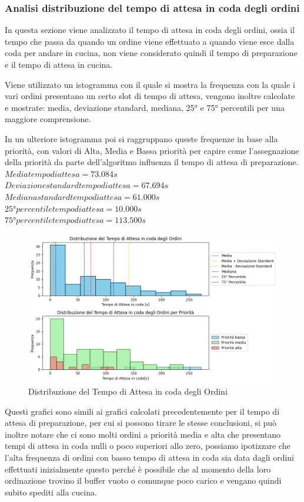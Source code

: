 \subsubsection{Analisi distribuzione del tempo di attesa in coda degli ordini}
In questa sezione viene analizzato il tempo di attesa in coda degli ordini, ossia il tempo che passa da quando un ordine viene effettuato a quando viene esce dalla coda per andare in cucina, non viene considerato quindi il tempo di preparazione e il tempo di attesa in cucina.

Viene utilizzato un istogramma con il quale si mostra la frequenza con la quale i vari ordini presentano un certo slot di tempo di attesa, vengono inoltre calcolate e mostrate: media, deviazione standard, mediana, 25° e 75° percentili per una maggiore comprensione.

In un ulteriore istogramma poi si raggruppano queste frequenze in base alla priorità, con valori di Alta, Media e Bassa priorità per capire come l'assegnazione della priorità da parte dell'algoritmo influenza il tempo di attesa di preparazione.\\
$Media tempo di attesa = 73.084s$\\
$Deviazione standard tempo di attesa = 67.694s$\\
$Mediana standard tempo di attesa = 61.000s$\\
$25° percentile tempo di attesa = 10.000s$\\
$75° percentile tempo di attesa = 113.500s$
\begin{figure}[H]
	\centering
	\includegraphics[scale=0.6]{iterazione3/images/distr_t_attesa_coda.png}
	\caption{Distribuzione del Tempo di Attesa in coda degli Ordini\label{fig:distr_t_attesa_coda}}
\end{figure}
Questi grafici sono simili ai grafici calcolati precedentemente per il tempo di attesa di preparazione, per cui si possono tirare le stesse conclusioni, si può inoltre notare che ci sono molti ordini a priorità media e alta che presentano tempi di attesa in coda nulli o poco superiori allo zero, possiamo ipotizzare che l'alta frequenza di ordini con basso tempo di attesa in coda sia data dagli ordini effettuati inizialmente questo perché è possibile che al momento della loro ordinazione trovino il buffer vuoto o comunque poco carico e vengano quindi subito spediti alla cucina.
